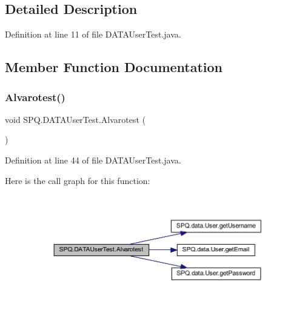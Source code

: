 \subsection{Detailed Description}


Definition at line 11 of file D\+A\+T\+A\+User\+Test.\+java.



\subsection{Member Function Documentation}
\mbox{\label{class_s_p_q_1_1_d_a_t_a_user_test_a9d47696cb1887a6d5712f0e9beae2182}} 
\subsubsection{\texorpdfstring{Alvarotest()}{Alvarotest()}}
{\footnotesize\ttfamily void S\+P\+Q.\+D\+A\+T\+A\+User\+Test.\+Alvarotest (\begin{DoxyParamCaption}{ }\end{DoxyParamCaption})}



Definition at line 44 of file D\+A\+T\+A\+User\+Test.\+java.

Here is the call graph for this function\+:
\nopagebreak
\begin{figure}[H]
\begin{center}
\leavevmode
\includegraphics[width=350pt]{class_s_p_q_1_1_d_a_t_a_user_test_a9d47696cb1887a6d5712f0e9beae2182_cgraph}
\end{center}
\end{figure}
\mbox{\label{class_s_p_q_1_1_d_a_t_a_user_test_a7defc94d9391e6721dee5c627f75e1fb}} 
